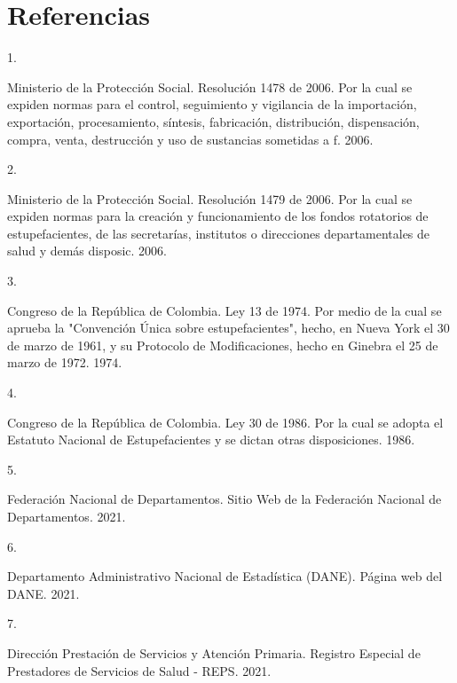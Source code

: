 \documentclass[
]{book}
\newlength{\cslhangindent}
\newlength{\csllabelwidth}
\newlength{\cslentryspacingunit} %
\newenvironment{CSLReferences}[2] %
 {%
  \setlength{\parindent}{0pt}
  \ifodd #1
  \let\oldpar\par
  \def\par{\hangindent=\cslhangindent\oldpar}
  \fi
  \setlength{\parskip}{#2\cslentryspacingunit}
 }%
 {}
\newcommand{\CSLLeftMargin}[1]{\parbox[t]{\csllabelwidth}{#1}}
\newcommand{\CSLRightInline}[1]{\parbox[t]{\linewidth - \csllabelwidth}{#1}\break}
\begin{document}
\hypertarget{referencias}{%
\chapter*{Referencias}\label{referencias}}

\hypertarget{refs}{}
\begin{CSLReferences}{0}{0}
\leavevmode{}%
\CSLLeftMargin{1. }
\CSLRightInline{Ministerio de la Protección Social. {Resoluci{ó}n 1478 de 2006. Por la cual se expiden normas para el control, seguimiento y vigilancia de la importaci{ó}n, exportaci{ó}n, procesamiento, s{í}ntesis, fabricaci{ó}n, distribuci{ó}n, dispensaci{ó}n, compra, venta, destrucci{ó}n y uso de sustancias sometidas a f}. 2006.}

\leavevmode{}%
\CSLLeftMargin{2. }
\CSLRightInline{Ministerio de la Protección Social. {Resoluci{ó}n 1479 de 2006. Por la cual se expiden normas para la creaci{ó}n y funcionamiento de los fondos rotatorios de estupefacientes, de las secretar{í}as, institutos o direcciones departamentales de salud y dem{á}s disposic}. 2006.}

\leavevmode{}%
\CSLLeftMargin{3. }
\CSLRightInline{Congreso de la República de Colombia. {Ley 13 de 1974. Por medio de la cual se aprueba la "Convenci{ó}n {Ú}nica sobre estupefacientes", hecho, en Nueva York el 30 de marzo de 1961, y su Protocolo de Modificaciones, hecho en Ginebra el 25 de marzo de 1972}. 1974.}

\leavevmode{}%
\CSLLeftMargin{4. }
\CSLRightInline{Congreso de la República de Colombia. {Ley 30 de 1986. Por la cual se adopta el Estatuto Nacional de Estupefacientes y se dictan otras disposiciones.} 1986.}

\leavevmode{}%
\CSLLeftMargin{5. }
\CSLRightInline{Federación Nacional de Departamentos. {Sitio Web de la Federaci{ó}n Nacional de Departamentos}. 2021.}

\leavevmode{}%
\CSLLeftMargin{6. }
\CSLRightInline{Departamento Administrativo Nacional de Estadística (DANE). {P{á}gina web del DANE}. 2021.}

\leavevmode{}%
\CSLLeftMargin{7. }
\CSLRightInline{Dirección Prestación de Servicios y Atención Primaria. {Registro Especial de Prestadores de Servicios de Salud - REPS.} 2021.}


\end{CSLReferences}
\end{document}
